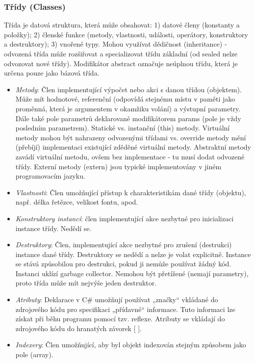 \subsubsection*{Třídy (Classes)}
Třída je datová struktura, která může obsahovat: 1) datové členy (konstanty a položky); 2) členské funkce (metody, vlastnosti, události, operátory, konstruktory a destruktory); 3) vnořené typy. Mohou využívat dědičnost (inheritance) - odvozená třída může rozšiřovat a specializovat třídu základní (od sealed nelze odvozovat nové třídy). Modifikátor abstract označuje neúplnou třídu, která je určena pouze jako bázová třída.
\begin{itemize}
\item \textit{Metody}: Člen implementující výpočet nebo akci s danou třídou (objektem). Může mít hodnotové, referenční (odpovídá stejnému místu v paměti jako proměnná, která je argumentem v okamžiku volání) a výstupní parametry. Dále také pole parametrů deklarované modifikátorem params (pole je vždy posledním parametrem). Statické vs. instanční (this) metody. Virtuální metody mohou být nahrazeny odvozenými třídami vs. override metody mění (přebíjí) implementaci existující zděděné virtuální metody. Abstraktní metody zavádí virtuální metodu, ovšem bez implementace - tu musí dodat odvozené třídy. Externí metody (extern) jsou typické implementovány v jiném programovacím jazyku.
\item \textit{Vlastnosti}: Člen umožňující přístup k charakteristikám dané třídy (objektu), např. délka řetězce, velikost fontu, apod.
\item \textit{Konstruktory instancí}: člen implementující akce nezbytné pro inicializaci instance třídy. Nedědí se.
\item \textit{Destruktory}: Člen, implementující akce nezbytné pro zrušení (destrukci) instance dané třídy. Destruktory se nedědí a nelze je volat explicitně. Instance se stává způsobilou pro destrukci, pokud ji nemůže používat žádný kód. Instanci uklízí garbage collector. Nemohou být přetížené (nemají parametry), proto třída může mít nejvýše jeden destruktor.
\item \textit{Atributy}: Deklarace v C\# umožňují používat „značky“ vkládané do zdrojového kódu pro specifikaci „přídavné“ informace. Tuto informaci lze získat při běhu programu pomocí tzv. reflexe. Atributy se vkládají do zdrojového kódu do hranatých závorek [ ].
\item \textit{Indexery}: Člen umožňující, aby byl objekt indexován stejným způsobem jako pole (array).
\end{itemize}

